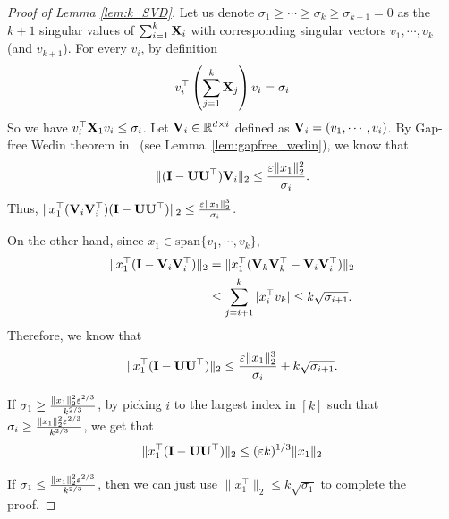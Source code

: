 \begin{proof}[Proof of Lemma \ref{lem:k_SVD}]
Let us denote $\sigma_1 \geq  \cdots \geq \sigma_k \geq \sigma_{k + 1} =  0$ as the $k + 1$ singular values of $\sum_{i = 1}^k \bold{X}_i$ with corresponding singular vectors $v_1, \cdots, v_k$ (and $v_{k + 1}$). For every $v_i$, by definition
\begin{align}
v_i^{\top} \left(\sum_{j = 1}^k \bold{X}_j \right)v_i = \sigma_i
\end{align}
So we have $v_i^{\top} \bold{X}_1 v_i  \leq \sigma_i$. Let $\bold{V}_i  \in \mathbb{R}^{d \times i}$ defined as $\bold{V}_i= (v_1, \cdots, v_i)$. By Gap-free Wedin theorem in~\citep{allen2016lazysvd} (see Lemma~\ref{lem:gapfree_wedin}), we know that 
\begin{align}
\| (\bold{I} - \bold{U} \bold{U}^{\top}) \bold{V}_i \|_2 \leq \frac{\varepsilon \| x_1 \|_2^2}{\sigma_i}.
\end{align}
Thus, $\|x_1^{\top} (\bold{V}_i  \bold{V}_i^{\top})(\bold{I} - \bold{U} \bold{U}^{\top}) \|_2 \leq \frac{\varepsilon \| x_1 \|_2^3}{\sigma_i}$. 

On the other hand, since $x_1 \in \text{span}\{v_1, \cdots, v_k \}$, 
\begin{align}
\|x_1^{\top} (\bold{I} - \bold{V}_i  \bold{V}_i^{\top}) \|_2 &= \|x_1^{\top} (\bold{V}_{k} \bold{V}_{k}^{\top} - \bold{V}_i  \bold{V}_i^{\top}) \|_2 
\\
&\leq  \sum_{j = i + 1}^k |x_i^{\top} v_k| \leq k \sqrt{\sigma_{i + 1}}.
\end{align}
Therefore, we know that 
\begin{align}
\| x_1^{\top}  (\bold{I} - \bold{U} \bold{U}^{\top}) \|_2 \leq \frac{\varepsilon \| x_1 \|_2^3}{\sigma_i} + k \sqrt{\sigma_{i + 1}}.
\end{align}

If $\sigma_1 \geq  \frac{\| x_1\|_2^2 \varepsilon^{2/3}}{k^{2/3}}$, by picking $i$ to the largest index in $[k]$ such that $\sigma_i \geq \frac{\| x_1\|_2^2 \varepsilon^{2/3}}{k^{2/3}}$,  we get that 
\begin{align}
\| x_1^{\top}  (\bold{I} - \bold{U} \bold{U}^{\top}) \|_2 \leq (\varepsilon k)^{1/3} \| x_1 \|_2
\end{align}

If $\sigma_1 \leq  \frac{\| x_1\|_2^2 \varepsilon^{2/3}}{k^{2/3}}$, then we can just use $\|x_1^{\top}  \|_2 \leq k \sqrt{\sigma_1}$ to complete the proof.
%
%
%
%
%
%
\end{proof}



